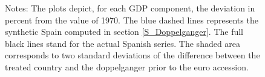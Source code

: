 \documentclass[12pt]{article}
\newcommand{\annote}[1]{\parbox{\textwidth}{\renewcommand{\baselinestretch}{1.0}\vspace{12pt} \small Notes: #1}}
\begin{document}
\begin{figure}[h!]
    \annote{The plots depict, for each GDP component, the deviation in percent from the value of 1970. The blue dashed lines represents the synthetic Spain computed in section \ref{S_Doppelganger}. The full black lines stand for the actual Spanish series. The shaded area corresponds to two standard deviations of the difference between the treated country and the doppelganger prior to the euro accession.}
\end{figure}
\end{document}
